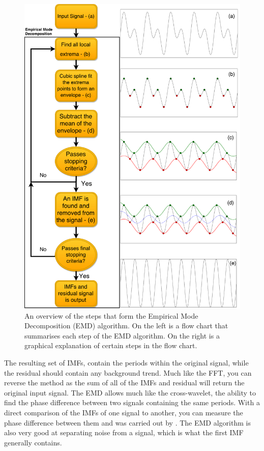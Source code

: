    	\begin{figure}
   		\centering
   		\includegraphics[width=1\textwidth]{EMD_FLOW.pdf}
   		\caption{
   			     An overview of the steps that form the Empirical Mode Decomposition (EMD) algorithm. 
   			     On the left is a flow chart that summarises each step of the EMD algorithm.
   			     On the right is a graphical explanation of certain steps in the flow chart. 
   		        }
   		\label{fig:EMD}
   	\end{figure}
   	    
    The resulting set of IMFs, contain the periods within the original signal, while the residual should contain any background trend.
    Much like the FFT, you can reverse the method as the sum of all of the IMFs and residual will return the original input signal.
    The EMD allows much like the cross-wavelet, the ability to find the phase difference between two signals containing the same periods.
    With a direct comparison of the IMFs of one signal to another, you can measure the phase difference between them and was carried out by \cite{morton2011}.
    The EMD algorithm is also very good at separating noise from a signal, which is what the first IMF generally contains.
   
